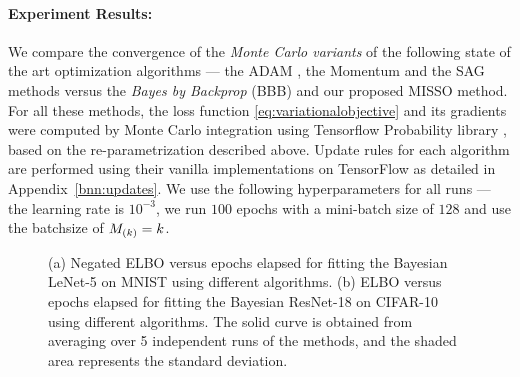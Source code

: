 \documentclass[11pt]{article}
\theoremstyle{t}
\begin{document}
\paragraph{Experiment Results:}
We compare the convergence of the \textit{Monte Carlo variants} of the following state of the art optimization algorithms --- the ADAM \citep{kingma:adam}, the Momentum \citep{sutskever2013importance} and the SAG \citep{schmidt2017minimizing} methods versus the \textit{Bayes by Backprop} (BBB) \citep{blundell2015weight} and our proposed MISSO method.
For all these methods, the loss function \eqref{eq:variationalobjective} and its gradients were computed by Monte Carlo integration using Tensorflow Probability library \citep{dillon2017tfp}, based on the re-parametrization described above.
Update rules for each algorithm are performed using their vanilla implementations on TensorFlow \citep{tensorflow2015-whitepaper} as detailed in Appendix~\ref{bnn:updates}.
We use the following hyperparameters for all runs --- the learning rate is $10^{-3}$, we run $100$ epochs with a mini-batch size of $128$ and use the batchsize of $\Bsize{k} = k$.\vspace{-.2cm}


\begin{figure}[H]
    \centering
    \qquad
  \caption{(a)  Negated ELBO versus epochs elapsed for fitting the Bayesian LeNet-5 on MNIST using different algorithms.
(b)  ELBO versus epochs elapsed for fitting the Bayesian ResNet-18 on CIFAR-10 using different algorithms.
The solid curve is obtained from averaging over 5 independent runs of the methods, and the shaded area represents the standard deviation.}\label{fig:lenetopt}
\end{figure}
\end{document}
